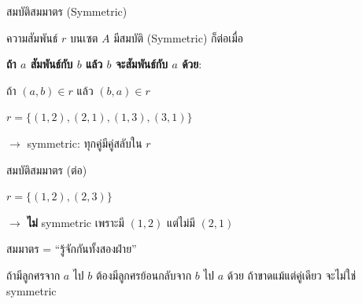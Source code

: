 \documentclass[11pt, aspectratio=169]{beamer}
\begin{document}
\begin{frame}{สมบัติสมมาตร (Symmetric)}
  \begin{explanation}[นิยาม]
    ความสัมพันธ์ $r$ บนเซต $A$ มีสมบัติ  (Symmetric) ก็ต่อเมื่อ

    \medskip
    \textbf{ถ้า $a$ สัมพันธ์กับ $b$ แล้ว $b$ จะสัมพันธ์กับ $a$ ด้วย}:

    \medskip
    ถ้า $(a, b) \in r$ แล้ว $(b, a) \in r$
  \end{explanation}

  \begin{exambox}[ตัวอย่าง]
    $r = \{(1,2), (2,1), (1,3), (3,1)\}$
    \par $\rightarrow$ symmetric: ทุกคู่มีคู่สลับใน $r$
  \end{exambox}
\end{frame}

\begin{frame}{สมบัติสมมาตร (ต่อ)}
  \begin{exambox}
    $r = \{(1,2), (2,3)\}$
    \par $\rightarrow$ \textbf{ไม่} symmetric เพราะมี $(1,2)$ แต่ไม่มี $(2,1)$
  \end{exambox}

  \begin{intuition}[คิดง่าย ๆ]
    สมมาตร = ``รู้จักกันทั้งสองฝ่าย''

    ถ้ามีลูกศรจาก $a$ ไป $b$ ต้องมีลูกศรย้อนกลับจาก $b$ ไป $a$ ด้วย
    ถ้าขาดแม้แต่คู่เดียว จะไม่ใช่ symmetric
  \end{intuition}
\end{frame}
\end{document}
